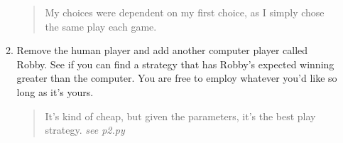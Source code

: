\documentclass{article}
\begin{document}
\begin{enumerate}
\begin{enumerate}
\begin{quote}
My choices were dependent on my first choice, as I simply chose the same play each game.
\end{quote}
\item Remove the human player and add another computer player called Robby.  See if you can find a strategy that has Robby's expected winning greater than the computer.  You are free to employ whatever you'd like so long as it's yours.
\begin{quote}
It's kind of cheap, but given the parameters, it's the best play strategy. {\it see p2.py}
\end{quote}

\end{enumerate}
\end{enumerate}
\end{document}
